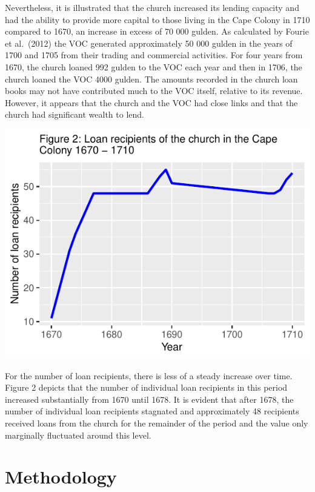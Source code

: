 \documentclass[11pt,preprint, authoryear]{elsarticle}
\numberwithin{equation}{section}
\numberwithin{figure}{section}
\numberwithin{table}{section}
\begin{document}
Nevertheless, it is illustrated that the church increased its lending
capacity and had the ability to provide more capital to those living in
the Cape Colony in 1710 compared to 1670, an increase in excess of 70
000 gulden. As calculated by Fourie et al.~(2012) the VOC generated
approximately 50 000 gulden in the years of 1700 and 1705 from their
trading and commercial activities. For four years from 1670, the church
loaned 992 gulden to the VOC each year and then in 1706, the church
loaned the VOC 4000 gulden. The amounts recorded in the church loan
books may not have contributed much to the VOC itself, relative to its
revenue. However, it appears that the church and the VOC had close links
and that the church had significant wealth to lend.

\begin{center}\includegraphics{HistoryEssay_files/figure-latex/unnamed-chunk-2-1} \end{center}

For the number of loan recipients, there is less of a steady increase
over time. Figure 2 depicts that the number of individual loan
recipients in this period increased substantially from 1670 until 1678.
It is evident that after 1678, the number of individual loan recipients
stagnated and approximately 48 recipients received loans from the church
for the remainder of the period and the value only marginally fluctuated
around this level.

\hypertarget{methodology}{%
\section{\texorpdfstring{Methodology
\label{Meth}}{Methodology }}\label{methodology}}
\end{document}
